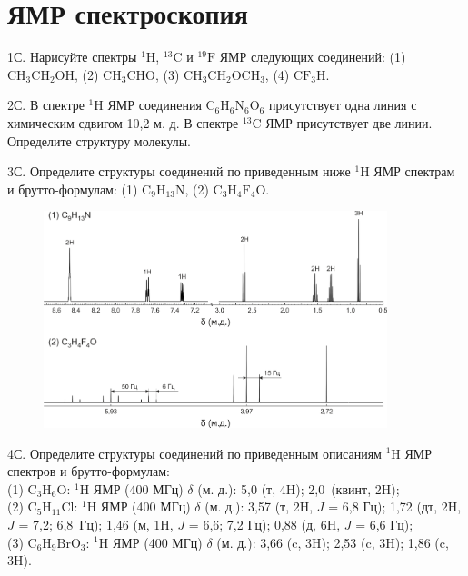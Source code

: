 \setmainfont{Noto Serif}
\setsansfont{Noto Sans}
\setmonofont{Noto Sans Mono}

\section{ЯМР спектроскопия}
1С. Нарисуйте спектры $^1\text{H}$, $^{13}\text{C}$ и $^{19}\text{F}$ ЯМР следующих соединений: (1) $\text{CH}_3\text{CH}_2\text{OH}$, (2) $\text{CH}_3\text{CH}\text{O}$, (3) $\text{CH}_3\text{CH}_2\text{O}\text{CH}_3$, (4) $\text{CF}_3\text{H}$.
\par
2С. В спектре $^1\text{H}$ ЯМР соединения $\text{C}_{6}\text{H}_{6}\text{N}_{6}\text{O}_{6}$ присутствует одна линия с химическим сдвигом 10,2 м. д. В спектре $^{13}\text{C}$ ЯМР присутствует две линии. Определите структуру молекулы.
\par
3С. Определите структуры соединений по приведенным ниже $^1\text{H}$ ЯМР спектрам и брутто-формулам: (1) $\text{C}_{9}\text{H}_{13}\text{N}$, (2) $\text{C}_{3}\text{H}_{4}\text{F}_4\text{O}$.
\begin{figure}[h]
\includegraphics[width=10cm]{images/Fig_2_9_3.png}
\centering
\end{figure}
\par
\vspace{-\parskip}
4С. Определите структуры соединений по приведенным описаниям $^1\text{H}$ ЯМР спектров и брутто-формулам:\\ 
(1) $\text{C}_{3}\text{H}_{6}\text{O}$: $^1$H ЯМР (400 МГц) $\delta$ (м. д.): 5,0 (т, 4H); 2,0~(квинт, 2H);\\
(2) $\text{C}_{5}\text{H}_{11}\text{Cl}$: $^1$H ЯМР (400 МГц) $\delta$ (м. д.): 3,57 (т, 2H, $J$ = 6,8 Гц); 1,72 (дт, 2H, $J$ = 7,2; 6,8~Гц); 1,46 (м, 1H, $J$ = 6,6; 7,2 Гц); 0,88 (д, 6H, $J$ = 6,6 Гц);\\
(3) $\text{C}_{6}\text{H}_{9}\text{Br}\text{O}_{3}$: $^1$H ЯМР (400 МГц) $\delta$ (м. д.): 3,66 (c, 3H); 2,53 (c, 3H); 1,86 (c, 3H).
